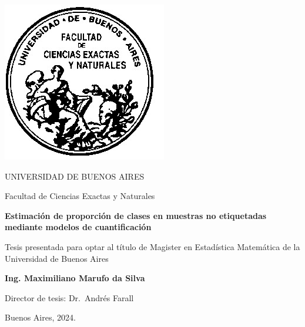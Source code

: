 \thispagestyle{empty}

\begin{center}
  \includegraphics[scale = 0.3]{logofac.jpg}
  
  \medskip
  UNIVERSIDAD DE BUENOS AIRES
  
  Facultad de Ciencias Exactas y Naturales
  
 
  
  \vspace{3cm}
  \textbf{\large Estimación de proporción de clases en muestras no etiquetadas \\ 
  mediante modelos de cuantificación}
  
  \vspace{2cm}
  Tesis presentada para optar al título de Magister en Estadística Matemática de
  la Universidad de Buenos Aires
  
  \vspace{2cm}
  \textbf{Ing. Maximiliano Marufo da Silva}
\end{center}


\vspace{1.5cm}
\noindent Director de tesis: Dr.~Andrés Farall
 

\vspace{1cm}
\noindent Buenos Aires,  2024.
